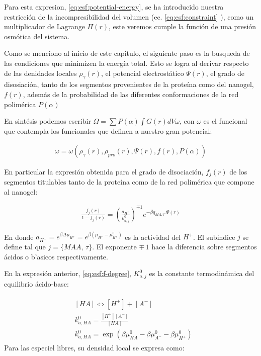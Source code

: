 Para esta expresion,  \ref{eq:esf:potential-energy}, se ha introducido nuestra restricci\'on de la incompresibilidad del volumen (ec. \ref{eq:esf:constraint} ), como un  multiplicador  de  Lagrange $\Pi(r)$, este veremos cumple la funci\'on de una presi\'on osm\'otica del sistema. 

Como se menciono al inicio de este capitulo, el siguiente paso es la busqueda de las condiciones que minimizen la energ\'ia total. Esto se logra al derivar respecto de las denidades locales $\rho_\gamma(r)$, el potencial electrost\'atico $\Psi(r)$, el grado de disosiaci\'on, tanto de los segmentos provenientes de la prote\'ina como del nanogel, $f(r)$, adem\'as de la probabilidad de las diferentes conformaciones de la red polim\'erica $P(\alpha)$

En sint\'esis podemos escribir $\Omega = \sum P(\alpha) \int{G(r) dV\omega}$,  con $\omega$ es el funcional que contempla los funcionales que definen a nuestro gran potencial: 

\begin{align}
	\omega=\omega(\rho_\gamma(r), \rho_{pro}(r),\Psi(r),f(r),P(\alpha))
	\label{eq:esf:funcionales-omega}
\end{align}


En particular la expresi\'on obtenida para el grado de disociaci\'on, $f_j(r)$ de los segmentos titulables tanto de la prote\'ina como de la red polim\'erica que compone al nanogel:

\begin{align}
	\frac{f_j(r)}{1-f_j(r)}= \left(\frac{a_{H^+}}{k^0_{a,j}}\right)^{\mp 1} e^{-\beta q_{MAA^-}\Psi(r)}
	\label{eq:esf:f-degree}
\end{align}

\noindent En donde  $a_{H^+}=e^{\beta\Delta\mu_{H^+}}=e^{\beta(\mu_{H^+} -\mu^0_{H^+})}$ es la actividad del $H^+$. El subindice  $j$ se define tal que  $j =\{MAA , \, \tau \}$. El exponente $\mp \, 1$ hace la diferencia sobre segmentos \'acidos o b'asicos respectivamente.

En la expresi\'on anterior, \ref{eq:esf:f-degree}, $K^0_{a,j}$ es la constante termodin\'amica del equilibrio \'acido-base:

\begin{align}
	\begin{aligned}
		& \left[HA\right] \Longleftrightarrow [H^+] +[A^-] \\
		& k_{a,HA}^0=\frac{[H^+][A^-]}{[HA]} \\
		& k_{a,HA}^0=\exp\left(\beta\mu_{HA}^0 - \beta \mu_{A^-}^0 - \beta \mu^0_{H^+} \right)
	\end{aligned}
	\label{eq:esf:dis-rxn}
\end{align}
Para las especiel libres, su densidad local se expresa como:


